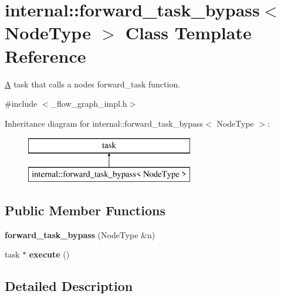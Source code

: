 \hypertarget{classinternal_1_1forward__task__bypass}{}\section{internal\+:\+:forward\+\_\+task\+\_\+bypass$<$ Node\+Type $>$ Class Template Reference}
\label{classinternal_1_1forward__task__bypass}


\hyperlink{structA}{A} task that calls a node\textquotesingle{}s forward\+\_\+task function.  




{\ttfamily \#include $<$\+\_\+flow\+\_\+graph\+\_\+impl.\+h$>$}

Inheritance diagram for internal\+:\+:forward\+\_\+task\+\_\+bypass$<$ Node\+Type $>$\+:\begin{figure}[H]
\begin{center}
\leavevmode
\includegraphics[height=2.000000cm]{classinternal_1_1forward__task__bypass}
\end{center}
\end{figure}
\subsection*{Public Member Functions}
\begin{DoxyCompactItemize}
\item 
\hypertarget{classinternal_1_1forward__task__bypass_aa3746fafebb9b5b2a1f5559b10ba3557}{}{\bfseries forward\+\_\+task\+\_\+bypass} (Node\+Type \&n)\label{classinternal_1_1forward__task__bypass_aa3746fafebb9b5b2a1f5559b10ba3557}

\item 
\hypertarget{classinternal_1_1forward__task__bypass_a9cb2bb0f2eb83ceadb2383a6367a167f}{}task $\ast$ {\bfseries execute} ()\label{classinternal_1_1forward__task__bypass_a9cb2bb0f2eb83ceadb2383a6367a167f}

\end{DoxyCompactItemize}


\subsection{Detailed Description}

